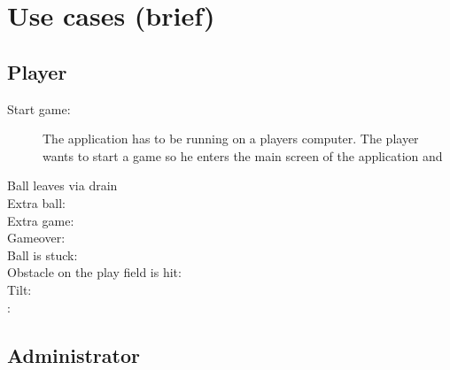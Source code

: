 \documentclass[fontsize=12pt,
               paper=a4,
               twoside=false,
               parskip=half,
               ]{scrartcl}
\begin{document}


\section{Use cases (brief)}

\subsection{Player}

\begin{description}

\item[Start game:]  The application has to be running on a players computer. The player wants to start a game so he enters the main screen of the application and 


\item[Ball leaves via drain]

\item[Extra ball:]


\item[Extra game:]

\item[Gameover:]

\item[Ball is stuck:]

\item[Obstacle on the play field is hit:]

\item[Tilt:]

\item[:]

\end{description}







\subsection{Administrator}
\end{document}
